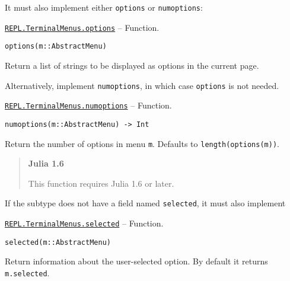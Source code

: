It must also implement either \texttt{options} or \texttt{numoptions}:


\hypertarget{11969972966785801049}{}
\hyperlink{11969972966785801049}{\texttt{REPL.TerminalMenus.options}}  -- {Function.}

\begin{adjustwidth}{2em}{0pt}


\begin{verbatim}
options(m::AbstractMenu)
\end{verbatim}

Return a list of strings to be displayed as options in the current page.

Alternatively, implement \texttt{numoptions}, in which case \texttt{options} is not needed.



\end{adjustwidth}
\hypertarget{469629341665446478}{}
\hyperlink{469629341665446478}{\texttt{REPL.TerminalMenus.numoptions}}  -- {Function.}

\begin{adjustwidth}{2em}{0pt}


\begin{verbatim}
numoptions(m::AbstractMenu) -> Int
\end{verbatim}

Return the number of options in menu \texttt{m}. Defaults to \texttt{length(options(m))}.

\begin{quote}
\textbf{Julia 1.6}

This function requires Julia 1.6 or later.

\end{quote}


\end{adjustwidth}

If the subtype does not have a field named \texttt{selected}, it must also implement


\hypertarget{1632874714880957610}{}
\hyperlink{1632874714880957610}{\texttt{REPL.TerminalMenus.selected}}  -- {Function.}

\begin{adjustwidth}{2em}{0pt}


\begin{verbatim}
selected(m::AbstractMenu)
\end{verbatim}

Return information about the user-selected option. By default it returns \texttt{m.selected}.



\end{adjustwidth}

